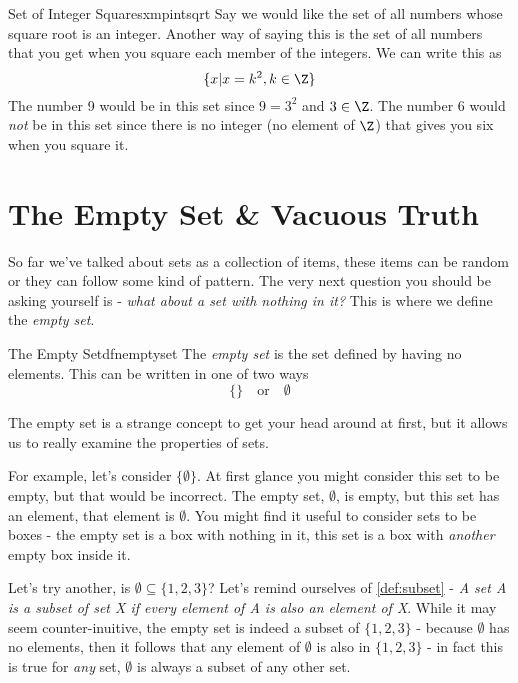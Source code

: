 \begin{exmpl}[label={exmpl:intsqrt}]{Set of Integer Squares}{xmpintsqrt}
    Say we would like the set of all numbers whose square root is an integer. Another way of saying this is the set of all numbers that you get when you square each member of the integers. We can write this as
    $$\{x | x = k^2, k \in \Z\}$$
    The number 9 would be in this set since $9 = 3^2$ and $3 \in \Z$. The number 6 would \emph{not} be in this set since there is no integer (no element of $\Z$) that gives you six when you square it.
\end{exmpl}

\section{The Empty Set \& Vacuous Truth}
So far we've talked about sets as a collection of items, these items can be random or they can follow some kind of pattern. The very next question you should be asking yourself is - \emph{what about a set with nothing in it?} This is where we define the \emph{empty set}.

\begin{dfn}[label={def:emptyset}]{The Empty Set}{dfnemptyset}
    The \emph{empty set} is the set defined by having no elements. This can be written in one of two ways
    $$\{\} \quad \text{or} \quad \emptyset$$
\end{dfn}

The empty set is a strange concept to get your head around at first, but it allows us to really examine the properties of sets.

For example, let's consider $\{\emptyset\}$. At first glance you might consider this set to be empty, but that would be incorrect. The empty set, $\emptyset$, is empty, but this set has an element, that element is $\emptyset$. You might find it useful to consider sets to be boxes - the empty set is a box with nothing in it, this set is a box with \emph{another} empty box inside it.

Let's try another, is $\emptyset \subseteq \{1,2,3\}$? Let's remind ourselves of \cref{def:subset} - \emph{A set A is a subset of set X if every element of A is also an element of X}. While it may seem counter-inuitive, the empty set is indeed a subset of $\{1,2,3\}$ - because $\emptyset$ has no elements, then it follows that any element of $\emptyset$ is also in $\{1,2,3\}$ - in fact this is true for \emph{any} set, $\emptyset$ is always a subset of any other set.


